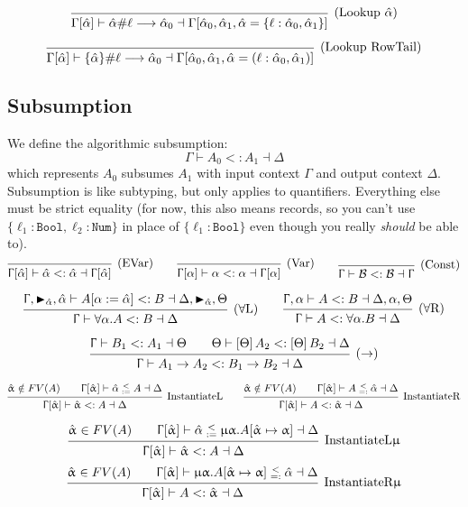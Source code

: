 \documentclass{article}
\newcommand{\recursive}[2]{\upmu {#1}. {#2}}
\newcommand{\tpvar}{\upalpha}
\newcommand{\spc}{\qquad}
\newcommand{\ctx}{\Upgamma}
\newcommand{\lbl}{\ell}
\newcommand{\marker}[1]{\RHD_{#1}}
\newcommand{\ev}{\hat}
\newcommand{\evar}[1][]{\ev \upalpha_{#1}}
\newcommand{\ctxinout}[3]{#1 \vdash #2 \dashv #3}
\newcommand{\subsume}{<:}
\newcommand{\subsumes}[4]{\ctxinout {#1} {#2 \subsume #3} {#4}}
\newcommand{\B}{\mathcal{B}}
\newcommand{\instLSymbol}{\;\substack{<\\:=}\;}
\newcommand{\instRSymbol}{\;\substack{<\\=:}\;}
\newcommand{\apply}[1]{\left[#1\right]}
\newcommand{\instL}[4]{#1 \vdash #2 \instLSymbol #3 \dashv #4}
\newcommand{\instR}[4]{#1 \vdash #2 \instRSymbol #3 \dashv #4}
\newcommand{\lookup}[5]{#1 \vdash #2 \# #3 \longrightarrow #4 \dashv #5}
\newcommand{\deduct}[3][]
{
  \begin{prooftree}
    \hypo{#2}
    \infer1[\text{#1}]{#3}
  \end{prooftree}
}
\begin{document}
\[
\deduct[(Lookup \(\ev\alpha\))]
  { }
  { \lookup
      {\Gamma[\ev\alpha]}
      {\ev\alpha}
      {\lbl}
      {\ev\alpha_0}
      {\Gamma[\ev\alpha_0, \ev\alpha_1, \ev\alpha = \{\lbl : \ev\alpha_0, \ev\alpha_1\}] }
  }
\]

\[
\deduct[(Lookup RowTail)]
  { }
  { \lookup
      {\Gamma[\ev\alpha]}
      {\{\ev\alpha\}}
      {\lbl}
      {\ev\alpha_0}
      {\Gamma[\ev\alpha_0, \ev\alpha_1, \ev\alpha = (\lbl : \ev\alpha_0, \ev\alpha_1)] }
  }
\]

\subsection{Subsumption}
We define the algorithmic subsumption:
\[
\subsumes{\Gamma}{A_0}{A_1}{\Delta}
\]
which represents $A_0$ subsumes $A_1$ with input context $\Gamma$ and output
context $\Delta$. Subsumption is like subtyping, but only applies to
quantifiers. Everything else must be strict equality (for now, this also means
records, so you can't use \(\{\lbl_1: \texttt{Bool}, \lbl_2: \texttt{Num}\}\) in
place of \(\{\lbl_1 : \texttt{Bool}\}\) even though you really \emph{should} be
able to).
\[
  \deduct[(EVar)]{}{\subsumes{\ctx[\ev\alpha]}{\ev\alpha}{\ev\alpha}{\ctx[\ev\alpha]}}
  \spc
  \deduct[(Var)]{}{\subsumes{\ctx[\alpha]}{\alpha}{\alpha}{\ctx[\alpha]}}
  \spc
  \deduct[(Const)]{}{\subsumes{\ctx}{\B}{\B}{\ctx}}
\]

\[
  \deduct[(\(\forall\)L)]
  { \subsumes{\ctx, \marker{\ev\alpha}, \ev\alpha}{A[\alpha := \ev\alpha]}{B}{\Delta, \marker{\ev\alpha}, \Theta} }
  { \subsumes{\ctx}{\forall \alpha. A}{B}{\Delta} }
  \spc
  \deduct[(\(\forall\)R)]
  { \subsumes{\ctx, \alpha}{A}{B}{\Delta, \alpha, \Theta} }
  { \subsumes{\ctx}{A}{\forall \alpha. B}{\Delta} }
\]

\[
  \deduct[(\(\to\))]
  { \subsumes{\ctx}{B_1}{A_1}{\Theta} \spc \subsumes{\Theta}{\apply\Theta A_2}{\apply\Theta B_2}{\Delta} }
  { \subsumes{\ctx}{A_1 \to A_2}{B_1 \to B_2}{\Delta} }
\]

\[
  \deduct[InstantiateL]
  {\evar \notin FV(A) \spc \instL{\ctx[\evar]}{\ev
      \alpha}{A}{\Delta}}
  {\subsumes{\ctx[\evar]}{\evar}{A}{\Delta}}
  \spc
  \deduct[InstantiateR]
  {\evar \notin FV(A) \spc \instR{\ctx[\evar]}{A}{\ev
      \alpha}{\Delta}}
  {\subsumes{\ctx[\evar]}{A}{\evar}{\Delta}}
\]

\[
  \deduct[InstantiateL\(\upmu\)]
  {\evar \in FV(A) \spc \instL{\ctx[\evar]}{\ev
      \alpha}{\recursive \tpvar A[\evar \mapsto \tpvar]}{\Delta}}
  {\subsumes{\ctx[\evar]}{\evar}{A}{\Delta}}
\]
\[
  \deduct[InstantiateR\(\upmu\)]
  {\evar \in FV(A) \spc \instR{\ctx[\evar]}{\recursive \tpvar A[\evar \mapsto \tpvar]}{\ev
      \alpha}{\Delta}}
  {\subsumes{\ctx[\evar]}{A}{\evar}{\Delta}}
\]
\end{document}
